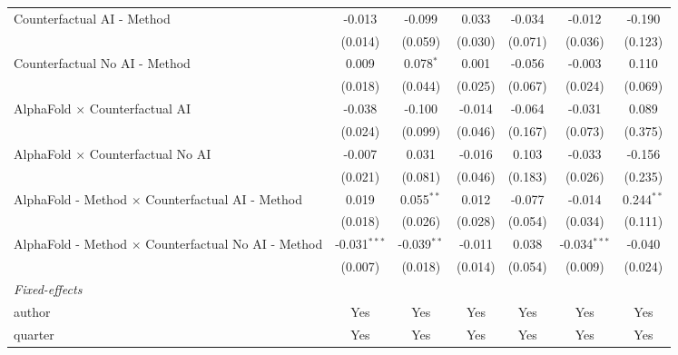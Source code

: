 \begin{tabular}{lcccccc}
   Counterfactual AI - Method                                 & -0.013         & -0.099        & 0.033         & -0.034  & -0.012         & -0.190\\   
                                                              & (0.014)        & (0.059)       & (0.030)       & (0.071) & (0.036)        & (0.123)\\   
   Counterfactual No AI - Method                              & 0.009          & 0.078$^{*}$   & 0.001         & -0.056  & -0.003         & 0.110\\   
                                                              & (0.018)        & (0.044)       & (0.025)       & (0.067) & (0.024)        & (0.069)\\   
   AlphaFold $\times$ Counterfactual AI                       & -0.038         & -0.100        & -0.014        & -0.064  & -0.031         & 0.089\\   
                                                              & (0.024)        & (0.099)       & (0.046)       & (0.167) & (0.073)        & (0.375)\\   
   AlphaFold $\times$ Counterfactual No AI                    & -0.007         & 0.031         & -0.016        & 0.103   & -0.033         & -0.156\\   
                                                              & (0.021)        & (0.081)       & (0.046)       & (0.183) & (0.026)        & (0.235)\\   
   AlphaFold - Method $\times$ Counterfactual AI - Method     & 0.019          & 0.055$^{**}$  & 0.012         & -0.077  & -0.014         & 0.244$^{**}$\\   
                                                              & (0.018)        & (0.026)       & (0.028)       & (0.054) & (0.034)        & (0.111)\\   
   AlphaFold - Method $\times$ Counterfactual No AI - Method  & -0.031$^{***}$ & -0.039$^{**}$ & -0.011        & 0.038   & -0.034$^{***}$ & -0.040\\   
                                                              & (0.007)        & (0.018)       & (0.014)       & (0.054) & (0.009)        & (0.024)\\   
   \midrule
   \emph{Fixed-effects}\\
   author                                                     & Yes            & Yes           & Yes           & Yes     & Yes            & Yes\\  
   quarter                                                    & Yes            & Yes           & Yes           & Yes     & Yes            & Yes\\  

\end{tabular}
